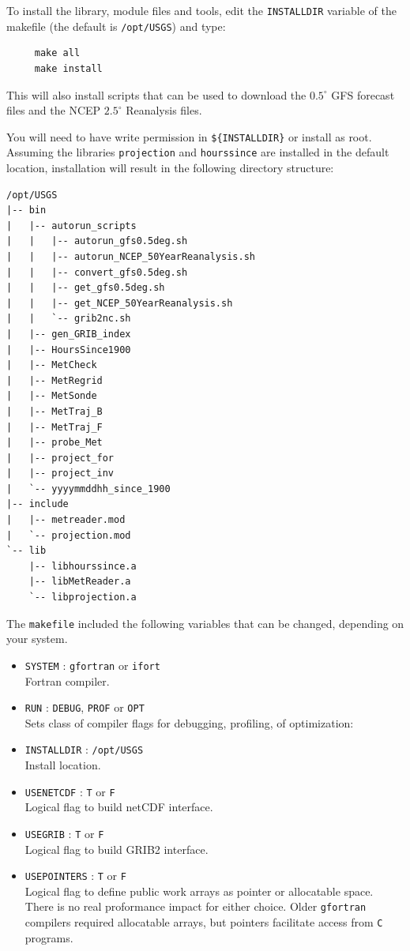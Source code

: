\documentclass[11pt]{article}   %
\begin{document}
To install the library, module files and tools, edit the \texttt{INSTALLDIR} variable of
the makefile (the default is \texttt{/opt/USGS}) and type:
\begin{verbatim}
     make all
     make install
\end{verbatim}
This will also install scripts that can be used to download the $0.5^{\circ}$ GFS
forecast files and the NCEP $2.5^{\circ}$ Reanalysis files.

You will need to have write permission in \texttt{\$\{INSTALLDIR\}}
or install as root.  Assuming the libraries \texttt{projection} and \texttt{hourssince} are
installed in the default location, installation will result in the following
directory structure:
\begin{verbatim}
/opt/USGS
|-- bin
|   |-- autorun_scripts
|   |   |-- autorun_gfs0.5deg.sh
|   |   |-- autorun_NCEP_50YearReanalysis.sh
|   |   |-- convert_gfs0.5deg.sh
|   |   |-- get_gfs0.5deg.sh
|   |   |-- get_NCEP_50YearReanalysis.sh
|   |   `-- grib2nc.sh
|   |-- gen_GRIB_index
|   |-- HoursSince1900
|   |-- MetCheck
|   |-- MetRegrid
|   |-- MetSonde
|   |-- MetTraj_B
|   |-- MetTraj_F
|   |-- probe_Met
|   |-- project_for
|   |-- project_inv
|   `-- yyyymmddhh_since_1900
|-- include
|   |-- metreader.mod
|   `-- projection.mod
`-- lib
    |-- libhourssince.a
    |-- libMetReader.a
    `-- libprojection.a
\end{verbatim}

The \texttt{makefile} included the following variables that can be changed, depending on your
system.
\begin{itemize}
\item \texttt{SYSTEM} : \texttt{gfortran} or \texttt{ifort}\\
Fortran compiler.
\item \texttt{RUN} : \texttt{DEBUG}, \texttt{PROF} or \texttt{OPT}\\
Sets class of compiler flags for debugging, profiling, of optimization:
\item \texttt{INSTALLDIR} : \texttt{/opt/USGS} \\
Install location.
\item \texttt{USENETCDF} : \texttt{T} or \texttt{F}\\
Logical flag to build netCDF interface.
\item \texttt{USEGRIB} : \texttt{T} or \texttt{F}\\
Logical flag to build GRIB2 interface.
\item \texttt{USEPOINTERS} : \texttt{T} or \texttt{F}\\
Logical flag to define public work arrays as pointer or allocatable space. There is no
real proformance impact for either choice. Older \texttt{gfortran} compilers
required allocatable arrays, but pointers facilitate access from \texttt{C} programs.
\end{itemize}
\end{document}

